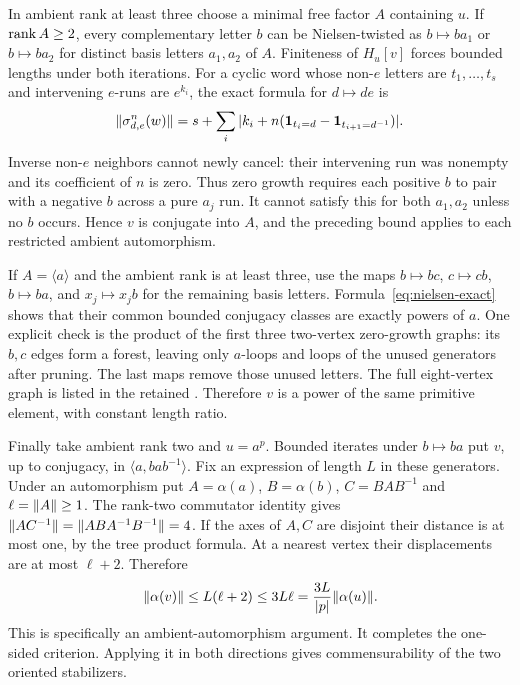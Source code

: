 In ambient rank at least three choose a minimal free factor $A$
containing $u$. If $\operatorname{rank} A\ge2$, every complementary letter $b$
can be Nielsen-twisted as $b\mapsto ba_1$ or $b\mapsto ba_2$ for
distinct basis letters $a_1,a_2$ of $A$. Finiteness of $H_u[v]$
forces bounded lengths under both iterations. For a cyclic word whose
non-$e$ letters are $t_1,\ldots,t_s$ and intervening $e$-runs are
$e^{k_i}$, the exact formula for $d\mapsto de$ is
\begin{equation}\label{eq:nielsen-exact}
 \lVert \sigma_{d,e}^n(w)\rVert
 =s+\sum_i|k_i+n(\mathbf1_{t_i=d}-\mathbf1_{t_{i+1}=d^{-1}})|.
\end{equation}
Inverse non-$e$ neighbors cannot newly cancel: their intervening run
was nonempty and its coefficient of $n$ is zero. Thus zero growth
requires each positive $b$ to pair with a negative $b$ across a pure
$a_j$ run. It cannot satisfy this for both $a_1,a_2$ unless no $b$
occurs. Hence $v$ is conjugate into $A$, and the preceding bound applies
to each restricted ambient automorphism.

If $A=\langle a\rangle$ and the ambient rank is at least three,
use the maps $b\mapsto bc$, $c\mapsto cb$, $b\mapsto ba$, and
$x_j\mapsto x_jb$ for the remaining basis letters. Formula~\eqref{eq:nielsen-exact}
shows that their common bounded conjugacy classes are exactly powers
of $a$. One explicit check is the product of the first three two-vertex
zero-growth graphs: its $b,c$ edges form a forest, leaving only
$a$-loops and loops of the unused generators after pruning. The last
maps remove those unused letters. The full eight-vertex graph is
listed in the retained .
Therefore $v$ is a power of the same primitive element, with constant
length ratio.

Finally take ambient rank two and $u=a^p$. Bounded iterates under
$b\mapsto ba$ put $v$, up to conjugacy, in
$\langle a,bab^{-1}\rangle$. Fix an expression of length $L$ in
these generators. Under an automorphism put $A=\alpha(a)$,
$B=\alpha(b)$, $C=BAB^{-1}$ and $\ell=\lVert A\rVert\ge1$.
The rank-two commutator identity gives
$\lVert AC^{-1}\rVert=\lVert ABA^{-1}B^{-1}\rVert=4$.
If the axes of $A,C$ are disjoint their distance is at most one,
by the tree product formula. At a nearest vertex their displacements
are at most $\ell+2$. Therefore
\[
 \lVert \alpha(v)\rVert\le L(\ell+2)\le3L\ell
 =\frac{3L}{|p|}\lVert \alpha(u)\rVert.
\]
This is specifically an ambient-automorphism argument. It completes
the one-sided criterion. Applying it in both directions gives
commensurability of the two oriented stabilizers.
